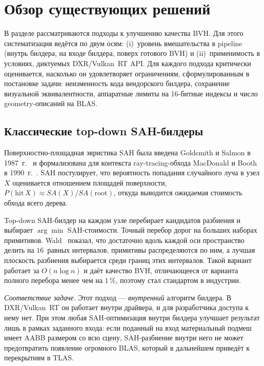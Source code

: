 \section{Обзор существующих решений}
\label{sec:Chapter2} 

В разделе рассматриваются подходы к улучшению качества BVH. Для этого систематизация ведётся по двум осям: (i)~уровень
вмешательства в pipeline (внутрь билдера, на входе билдера, поверх
готового BVH) и (ii)~применимость в условиях, диктуемых
DXR/Vulkan~RT API. Для каждого подхода критически оценивается,
насколько он удовлетворяет ограничениям, сформулированным в
постановке задачи: неизменность кода
вендорского билдера, сохранение визуальной эквивалентности,
аппаратные лимиты на 16-битные индексы и число
geometry-описаний на BLAS.

\subsection{Классические top-down SAH-билдеры}

Поверхностно-площадная эвристика SAH
была введена Goldsmith и Salmon в 1987~г.~\cite{goldsmith1987} и
формализована для контекста ray-tracing-обхода
MacDonald и Booth в 1990~г.~\cite{macdonald1990}. SAH постулирует,
что вероятность попадания случайного луча в узел $X$ оценивается
отношением площадей поверхности,
$P(\text{hit}\,X)\!\approx\!SA(X)/SA(\text{root})$,
откуда выводится ожидаемая стоимость обхода всего дерева.

Top-down SAH-билдер на каждом узле перебирает кандидатов разбиения и выбирает $\arg\min$
SAH-стоимости. Точный перебор дорог на больших наборах примитивов.
Wald~\cite{wald2007} показал, что достаточно вдоль каждой оси
пространство делить на $16$~равных интервалов, примитивы
распределяются по ним, а лучшая плоскость разбиения выбирается среди
границ этих интервалов. Такой вариант работает за $O(n\log n)$ и даёт качество BVH,
отличающееся от варианта полного перебора менее чем на $1\,\%$, поэтому стал
стандартом в индустрии.

\textit{Соответствие задаче.} Этот подход --- \emph{внутренний} алгоритм
билдера. В DXR/Vulkan~RT он работает внутри драйвера, и для
разработчика доступа к нему нет. При этом любая SAH-оптимизация внутри
билдера улучшает результат лишь в рамках заданного входа: если
поданный на вход материальный подмеш имеет AABB размером со всю сцену, SAH-разбиение внутри него не
может предотвратить появление огромного BLAS, который в дальнейшем приведёт к перекрытиям в TLAS.

